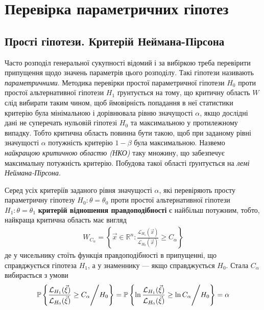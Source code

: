 \section{Перевірка параметричних гіпотез}
\subsection{Прості гіпотези. Критерій Неймана-Пірсона}

Часто розподіл генеральної сукупності відомий і за вибіркою треба перевірити 
припущення щодо значень параметрів цього розподілу. Такі гіпотези називають 
\emph{параметричними}. Методика перевірки простої параметричної гіпотези $H_0$
проти простої альтернативної гіпотези $H_1$ ґрунтується на тому, що критичну область $W$
слід вибирати таким чином, щоб ймовірність попадання в неї статистики критерію була мінімальною і 
дорівнювала рівню значущості $\alpha$, якщо дослідні дані не суперечать нульовій гіпотезі $H_0$ та 
максимальною у протилежному випадку. 
Тобто критична область повинна бути такою, щоб при заданому рівні значущості $\alpha$ потужність критерію
$1-\beta$ була максимальною. Назвемо \emph{найкращою критичною областю (НКО)} таку множину, що забезпечує максимальну 
потужність критерію. Побудова такої області ґрунтується на \emph{лемі Неймана-Пірсона}. 
\begin{theorem*}
    Серед усіх критеріїв заданого рівня значущості $\alpha$, які 
    перевіряють просту параметричну гіпотезу $H_0 : \theta = \theta_0$ проти простої альтернативної гіпотези 
    $H_1: \theta = \theta_1$ \textbf{критерій відношення правдоподібності} є найбільш потужним, тобто, найкраща критична область
    має вигляд
    \begin{gather}
        W_{C_\alpha} = \left\{
            \vec{x} \in \mathbb{R}^n : \frac{\mathcal{L}_{H_1}(\vec{x})}{\mathcal{L}_{H_0}(\vec{x})} \geq C_{\alpha}
         \right\}
    \end{gather}
    де у чисельнику стоїть функція правдоподібності в припущенні, що справджується 
    гіпотеза $H_1$, а у знаменнику --- якщо справджується $H_0$. Стала $C_{\alpha}$ вибирається з умови
    \begin{gather}
        \P \left\{ \frac{\mathcal{L}_{H_1}(\vec{\xi})}{\mathcal{L}_{H_0}(\vec{\xi})} \geq C_{\alpha} \middle/ H_0\right\} = 
        \P \left\{ \ln\frac{\mathcal{L}_{H_1}(\vec{\xi})}{\mathcal{L}_{H_0}(\vec{\xi})} \geq \ln C_{\alpha} \middle/ H_0\right\} = \alpha
    \end{gather}
\end{theorem*}
